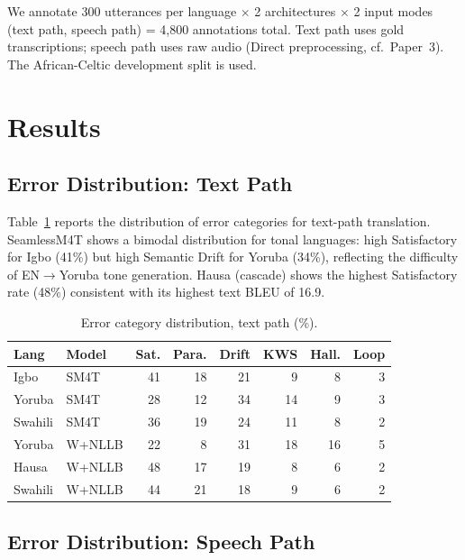 \documentclass[11pt,a4paper]{article}
\begin{document}
We annotate 300 utterances per language $\times$ 2 architectures $\times$ 2 input modes (text path, speech path) = 4,800 annotations total. Text path uses gold transcriptions; speech path uses raw audio (Direct preprocessing, cf.\ Paper~3). The African-Celtic development split is used.

\section{Results}
\label{sec:results}

\subsection{Error Distribution: Text Path}

Table~\ref{tab:text_path_errors} reports the distribution of error categories for text-path translation. SeamlessM4T shows a bimodal distribution for tonal languages: high Satisfactory for Igbo (41\%) but high Semantic Drift for Yoruba (34\%), reflecting the difficulty of EN$\to$Yoruba tone generation. Hausa (cascade) shows the highest Satisfactory rate (48\%) consistent with its highest text BLEU of 16.9.

\begin{table}[t]
\centering
\small
\setlength{\tabcolsep}{3pt}
\caption{Error category distribution, text path (\%).}
\label{tab:text_path_errors}
\begin{tabular}{llrrrrrr}
\toprule
\textbf{Lang} & \textbf{Model} & \textbf{Sat.} & \textbf{Para.} & \textbf{Drift} & \textbf{KWS} & \textbf{Hall.} & \textbf{Loop} \\
\midrule
Igbo   & SM4T   & 41 & 18 & 21 &  9 &  8 &  3 \\
Yoruba & SM4T   & 28 & 12 & 34 & 14 &  9 &  3 \\
Swahili& SM4T   & 36 & 19 & 24 & 11 &  8 &  2 \\
Yoruba & W+NLLB & 22 &  8 & 31 & 18 & 16 &  5 \\
Hausa  & W+NLLB & 48 & 17 & 19 &  8 &  6 &  2 \\
Swahili& W+NLLB & 44 & 21 & 18 &  9 &  6 &  2 \\
\bottomrule
\end{tabular}
\end{table}

\subsection{Error Distribution: Speech Path}
\end{document}

